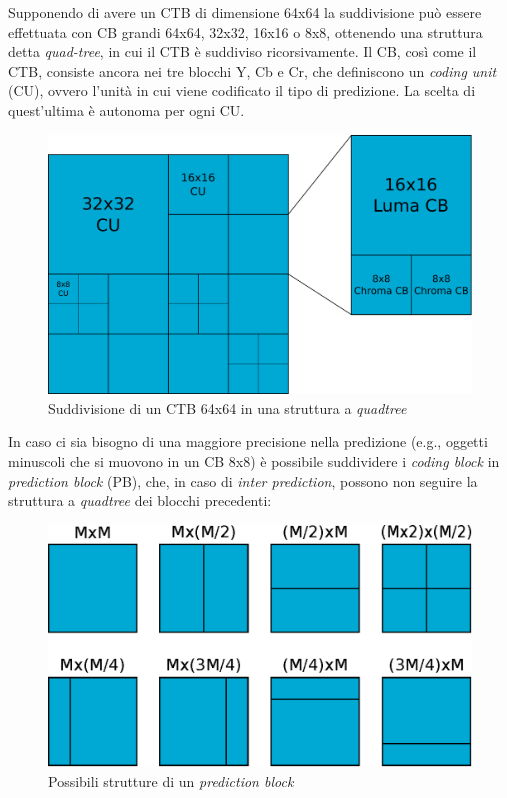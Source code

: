 Supponendo di avere un CTB di dimensione 64x64 la suddivisione può essere 
effettuata con CB grandi 64x64, 32x32, 16x16 o 8x8, ottenendo una struttura
detta \emph{quad-tree}, in cui il CTB è suddiviso ricorsivamente. 
Il CB, così come il CTB, consiste ancora nei tre blocchi Y, Cb e 
Cr, che definiscono un \emph{coding unit} (CU), ovvero l'unità in cui viene 
codificato il tipo di predizione. La scelta di quest'ultima è autonoma per ogni 
CU.
\begin{figure}[H]
  \centering
  \includegraphics[scale=0.50]{Figures/CTB-CU-CB}
  \caption[Suddivisione del CTB in CU]{Suddivisione di un CTB 64x64 in una 
struttura a \emph{quadtree}}
\end{figure}
In caso ci sia bisogno di una maggiore precisione nella predizione (e.g., 
oggetti minuscoli che si muovono in un CB 8x8) è possibile suddividere i
\emph{coding block} in \emph{prediction block} (PB), che, in caso di 
\emph{inter prediction}, possono non seguire la struttura a \emph{quadtree} dei
blocchi precedenti:
\begin{figure}[H]
  \centering
  \includegraphics[scale=0.75]{Figures/PB}
  \caption{Possibili strutture di un \emph{prediction block}}
\end{figure}
